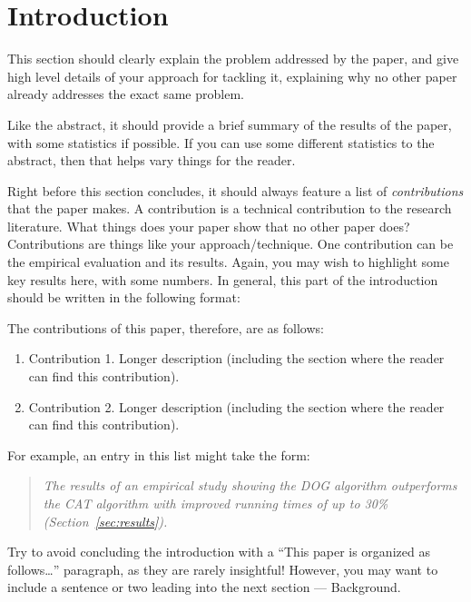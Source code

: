 \section{Introduction}
\label{sec:introduction}

%


This section should clearly explain the problem addressed 
by the paper, and give high level details of your approach
for tackling it, explaining why no other paper already
addresses the exact same problem.

Like the abstract, it should provide a brief summary of 
the results of the paper, with some statistics if possible. 
If you can use some different statistics to the 
abstract, then that helps vary things for the reader.

Right before this section concludes, it should always
feature a list of {\em contributions} that the paper makes.
A contribution is a technical contribution to the 
research literature. What things does your paper show
that no other paper does? Contributions are things 
like your approach/technique. 
One contribution can be the empirical evaluation and
its results. Again, you may wish to highlight some 
key results here, with some numbers. In general, this
part of the introduction should be written in the following
format:

The contributions of this paper, therefore, are as follows:

\begin{enumerate}

    \item Contribution 1. Longer description
    (including the section where the reader can find this 
    contribution).
    
    \item Contribution 2. Longer description
    (including the section where the reader can find this 
    contribution).

\end{enumerate}    

For example, an entry in this list might take the form:
\begin{quote} \it
    The results of an empirical study showing the DOG
    algorithm outperforms the CAT algorithm with
    improved running times of up to 30\% 
    (Section~\ref{sec:results}).
\end{quote}

Try to avoid concluding the introduction with a 
``This paper is organized as follows\ldots'' paragraph,
as they are rarely insightful! 
%
However, you may want to include a sentence or two 
leading into the next section --- Background.